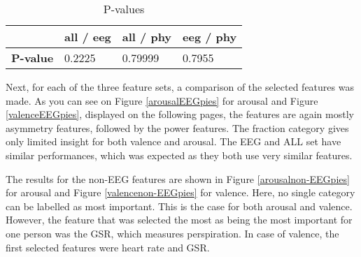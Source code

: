 \begin{table}[H]
\centering
\caption{P-values\label{pvals}}
\begin{tabular}{l|lll}
	    & \textbf{all / eeg} & \textbf{all / phy} & \textbf{eeg / phy} \\ \hline
\textbf{P-value} & 0.2225             & 0.79999            & 0.7955            
\end{tabular}
\end{table}
\clearpage

Next, for each of the three feature sets, a comparison of the selected features was made. As you can see on Figure \ref{arousalEEGpies} for arousal and Figure \ref{valenceEEGpies}, displayed on the following pages, the features are again mostly asymmetry features, followed by the power features. The fraction category gives only limited insight for both valence and arousal. The EEG and ALL set have similar performances, which was expected as they both use very similar features.

\npar

The results for the non-EEG features are shown in Figure \ref{arousalnon-EEGpies} for arousal and Figure \ref{valencenon-EEGpies} for valence.
Here, no single category can be labelled as most important. This is the case for both arousal and valence. However, the feature that was selected the most as being the most important for one person was the GSR, which measures perspiration. In case of valence, the first selected features were heart rate and GSR.

